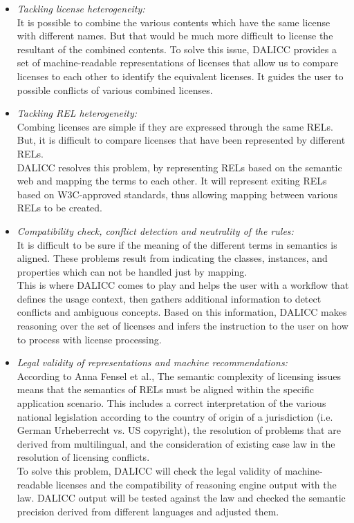 \begin{itemize}
	\item \textit{Tackling license heterogeneity:} \\
	It is possible to combine the various contents which have the same license with different names. But that would be much more difficult to license the resultant of the combined contents. To solve this issue, DALICC provides a set of machine-readable representations of licenses that allow us to compare licenses to each other to identify the equivalent licenses. It guides the user to possible conflicts of various combined licenses.
	\item \textit{Tackling REL heterogeneity:} \\
	Combing licenses are simple if they are expressed through the same RELs. But, it is difficult to compare licenses that have been represented by different RELs.\\
	DALICC resolves this problem, by representing RELs based on the semantic web and mapping the terms to each other. It will represent exiting RELs based on W3C-approved standards, thus allowing mapping between various RELs to be created.
	\item \textit{Compatibility check, conflict detection and neutrality of the rules:} \\
	It is difficult to be sure if the meaning of the different terms in semantics is aligned. These problems result from indicating the classes, instances, and properties which can not be handled just by mapping.\\
	This is where DALICC comes to play and helps the user with a workflow that defines the usage context, then gathers additional information to detect conflicts and ambiguous concepts. Based on this information, DALICC makes reasoning over the set of licenses and infers the instruction to the user on how to process with license processing.\\
	\item \textit{Legal validity of representations and machine recommendations:} \\
	According to Anna Fensel et al.\cite{Anna}, The semantic complexity of licensing issues means that the semantics of RELs must be aligned within the specific application scenario. This includes a correct interpretation of the various national legislation according to the country of origin of a jurisdiction (i.e. German Urheberrecht vs. US copyright), the resolution of problems that are derived from multilingual, and the consideration of existing case law in the resolution of licensing conflicts.\cite{Anna}\\
	To solve this problem, DALICC will check the legal validity of machine-readable licenses and the compatibility of reasoning engine output with the law. DALICC output will be tested against the law and checked the semantic precision derived from different languages and adjusted them\cite{Anna}.
	
\end{itemize}
